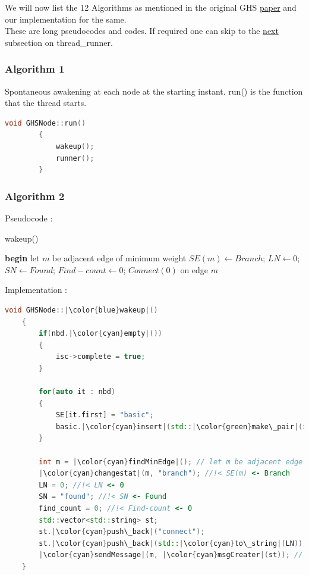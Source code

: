 \documentclass[letterpaper,11pt]{article}
\begin{document}
	\medskip
	
	We will now list the 12 Algorithms as mentioned in the original GHS \href{https://dl.acm.org/doi/abs/10.1145/357195.357200}{paper} and our implementation for the same. \\
	
	These are long pseudocodes and codes. If required one can skip to the \hyperlink{s2d4}{next} subsection on thread\_runner.
	
	\subsubsection{Algorithm 1}
	Spontaneous awakening at each node at the starting instant. {\sc run}() is the function that the thread starts. 
	
	\begin{lstlisting}[language=C++, caption= run]
		void GHSNode::run()
		{
			wakeup();
			runner();
		}
	\end{lstlisting}
	
	\subsubsection{Algorithm 2}
	Pseudocode : \\
	
	\begin{tcolorbox}
	wakeup()
	\begin{algorithmic}
		\STATE \textbf{begin}
		\STATE let $m$ be adjacent edge of minimum weight 
		\STATE $SE(m) \leftarrow Branch$; 
		\STATE $LN \leftarrow 0$;
		\STATE $SN \leftarrow Found$;
		\STATE $Find-count \leftarrow 0$;
		 $Connect(0)$ on edge $m$
	\end{algorithmic}
	\end{tcolorbox}

	\bigskip 
	
	Implementation : 
	
	
	\begin{lstlisting}[language=C++, caption= wakeup]
	void GHSNode::|\color{blue}wakeup|()
	{
		if(nbd.|\color{cyan}empty|())
		{
			isc->complete = true;
		}
		
		for(auto it : nbd)
		{
			SE[it.first] = "basic";
			basic.|\color{cyan}insert|(std::|\color{green}make\_pair|(it.second, it.first));
		}
		
		int m = |\color{cyan}findMinEdge|(); // let m be adjacent edge of minimum weight;
		|\color{cyan}changestat|(m, "branch"); //!< SE(m) <- Branch
		LN = 0; //!< LN <- 0
		SN = "found"; //!< SN <- Found
		find_count = 0; //!< Find-count <- 0
		std::vector<std::string> st;
		st.|\color{cyan}push\_back|("connect");
		st.|\color{cyan}push\_back|(std::|\color{cyan}to\_string|(LN));
		|\color{cyan}sendMessage|(m, |\color{cyan}msgCreater|(st)); //!< send Connect(0) on edge m
	}
	\end{lstlisting}
	
\end{document}
